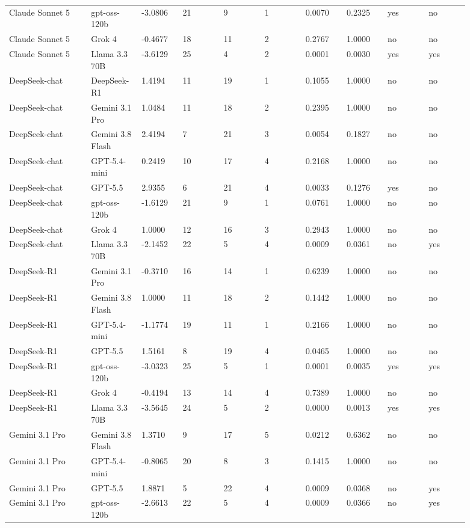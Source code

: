 \begin{landscape}
\begin{longtable}{p{0.162\linewidth}p{0.081\linewidth}p{0.081\linewidth}p{0.081\linewidth}p{0.081\linewidth}p{0.081\linewidth}p{0.081\linewidth}p{0.081\linewidth}p{0.081\linewidth}p{0.081\linewidth}}
Claude Sonnet 5 & gpt-oss-120b & -3.0806 & 21 & 9 & 1 & 0.0070 & 0.2325 & yes & no \\
Claude Sonnet 5 & Grok 4 & -0.4677 & 18 & 11 & 2 & 0.2767 & 1.0000 & no & no \\
Claude Sonnet 5 & Llama 3.3 70B & -3.6129 & 25 & 4 & 2 & 0.0001 & 0.0030 & yes & yes \\
DeepSeek-chat & DeepSeek-R1 & 1.4194 & 11 & 19 & 1 & 0.1055 & 1.0000 & no & no \\
DeepSeek-chat & Gemini 3.1 Pro & 1.0484 & 11 & 18 & 2 & 0.2395 & 1.0000 & no & no \\
DeepSeek-chat & Gemini 3.8 Flash & 2.4194 & 7 & 21 & 3 & 0.0054 & 0.1827 & no & no \\
DeepSeek-chat & GPT-5.4-mini & 0.2419 & 10 & 17 & 4 & 0.2168 & 1.0000 & no & no \\
DeepSeek-chat & GPT-5.5 & 2.9355 & 6 & 21 & 4 & 0.0033 & 0.1276 & yes & no \\
DeepSeek-chat & gpt-oss-120b & -1.6129 & 21 & 9 & 1 & 0.0761 & 1.0000 & no & no \\
DeepSeek-chat & Grok 4 & 1.0000 & 12 & 16 & 3 & 0.2943 & 1.0000 & no & no \\
DeepSeek-chat & Llama 3.3 70B & -2.1452 & 22 & 5 & 4 & 0.0009 & 0.0361 & no & yes \\
DeepSeek-R1 & Gemini 3.1 Pro & -0.3710 & 16 & 14 & 1 & 0.6239 & 1.0000 & no & no \\
DeepSeek-R1 & Gemini 3.8 Flash & 1.0000 & 11 & 18 & 2 & 0.1442 & 1.0000 & no & no \\
DeepSeek-R1 & GPT-5.4-mini & -1.1774 & 19 & 11 & 1 & 0.2166 & 1.0000 & no & no \\
DeepSeek-R1 & GPT-5.5 & 1.5161 & 8 & 19 & 4 & 0.0465 & 1.0000 & no & no \\
DeepSeek-R1 & gpt-oss-120b & -3.0323 & 25 & 5 & 1 & 0.0001 & 0.0035 & yes & yes \\
DeepSeek-R1 & Grok 4 & -0.4194 & 13 & 14 & 4 & 0.7389 & 1.0000 & no & no \\
DeepSeek-R1 & Llama 3.3 70B & -3.5645 & 24 & 5 & 2 & 0.0000 & 0.0013 & yes & yes \\
Gemini 3.1 Pro & Gemini 3.8 Flash & 1.3710 & 9 & 17 & 5 & 0.0212 & 0.6362 & no & no \\
Gemini 3.1 Pro & GPT-5.4-mini & -0.8065 & 20 & 8 & 3 & 0.1415 & 1.0000 & no & no \\
Gemini 3.1 Pro & GPT-5.5 & 1.8871 & 5 & 22 & 4 & 0.0009 & 0.0368 & no & yes \\
Gemini 3.1 Pro & gpt-oss-120b & -2.6613 & 22 & 5 & 4 & 0.0009 & 0.0366 & no & yes \\

\end{longtable}
\end{landscape}
